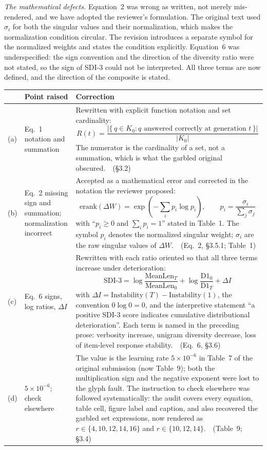 \documentclass[11pt,a4paper]{article}
\newcommand{\newtext}[1]{\textcolor{chgcolor}{``#1''}}
\newcommand{\renum}[2]{#1 of the original submission (now #2)}
\begin{document}
\medskip\noindent\emph{The mathematical defects.}
Equation~2 was wrong as written, not merely mis-rendered, and we have
adopted the reviewer's formulation. The original text used $\sigma_i$
for both the singular values and their normalization, which makes the
normalization condition circular. The revision introduces a separate
symbol for the normalized weights and states the condition explicitly.
Equation~6 was underspecified: the sign convention and the direction of
the diversity ratio were not stated, so the sign of SDI-3 could not be
interpreted. All three terms are now defined, and the direction of the
composite is stated.

\medskip
\renewcommand{\arraystretch}{1.3}
\begin{longtable}{@{}L{0.5cm}L{3.0cm}L{10.6cm}@{}}
\toprule
{} & \textbf{Point raised} & \textbf{Correction} \\
\midrule
\endfirsthead
\bottomrule
\endfoot

(a) & Eq.~1 notation and summation &
Rewritten with explicit function notation and set cardinality:
\[
  R(t) = \frac{\bigl|\{\, q \in K_0 :
          q \text{ answered correctly at generation } t \,\}\bigr|}
         {|K_0|}
\]
The numerator is the cardinality of a set, not a summation, which is
what the garbled original obscured.\ \ (\S3.2) \\

(b) & Eq.~2 missing sign and summation; normalization incorrect &
Accepted as a mathematical error and corrected in the notation the
reviewer proposed:
\[
  \mathrm{erank}(\Delta W) = \exp\!\left(-\sum_i p_i \log p_i\right),
  \qquad p_i = \frac{\sigma_i}{\sum_j \sigma_j}
\]
with \newtext{$p_i \ge 0$ and $\sum_i p_i = 1$} stated in Table~1. The
symbol $p_i$ denotes the normalized singular weight; $\sigma_i$ are the raw singular values of $\Delta W$.\ \
(Eq.~2, \S3.5.1; Table~1) \\

(c) & Eq.~6 signs, log ratios, $\Delta I$ &
Rewritten with each ratio oriented so that all three terms increase
under deterioration:
\[
  \mathrm{SDI\text{-}3} =
  \log\frac{\mathrm{MeanLen}_T}{\mathrm{MeanLen}_0}
  + \log\frac{\mathrm{D1}_0}{\mathrm{D1}_T}
  + \Delta I
\]
with $\Delta I = \mathrm{Instability}(T) - \mathrm{Instability}(1)$, the
convention $0\log 0 = 0$, and the interpretive statement
\newtext{a positive SDI-3 score indicates cumulative distributional
deterioration}. Each term is named in the preceding prose: verbosity
increase, unigram diversity decrease, loss of item-level response
stability.\ \ (Eq.~6, \S3.6) \\

(d) & $5\times10^{-6}$; check elsewhere &
The value is the learning rate $5\times10^{-6}$ in
\renum{Table~7}{Table~9}; both the multiplication sign and the
negative exponent were lost to the glyph fault. The instruction to check
elsewhere was followed systematically: the audit covers every equation,
table cell, figure label and caption, and also recovered the garbled set
expressions, now rendered as $r \in \{4, 10, 12, 14, 16\}$ and
$r \in \{10, 12, 14\}$.\ \ (Table~9; \S3.4) \\
\end{longtable}
\end{document}
